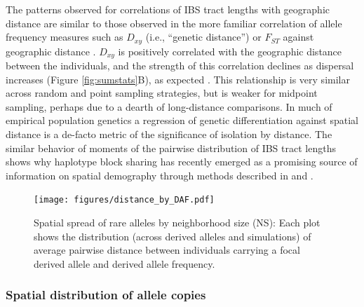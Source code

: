 \documentclass[10pt,twoside,lineno,hidelinks]{preprint}
\begin{document}

The patterns observed for correlations of IBS tract lengths with geographic distance are similar to those observed in the more familiar correlation of allele frequency measures such as $D_{xy}$ (i.e., ``genetic distance'') or $F_{ST}$ against geographic distance \citep{Rousset1997}. $D_{xy}$ is positively correlated with the geographic distance between the individuals, and the strength of this correlation declines as dispersal increases (Figure \ref{fig:sumstats}B), as expected \citep{Wright1943,Rousset1997}. This relationship is very similar across random and point sampling strategies, but is weaker for midpoint sampling, perhaps due to a dearth of long-distance comparisons. In much of empirical population genetics a regression of genetic differentiation against spatial distance is a de-facto metric of the significance of isolation by distance. The similar behavior of moments of the pairwise distribution of IBS tract lengths shows why haplotype block sharing has recently emerged as a promising source of information on spatial demography through methods described in \citet{Ringbauer2017} and \citet{Baharian2016}. 

\begin{figure}[p]
\centering
\texttt{[image: figures/distance\_by\_DAF.pdf]}
\caption{
    Spatial spread of rare alleles by neighborhood size (NS):
    Each plot shows the distribution (across derived alleles and simulations)
    of average pairwise distance between individuals carrying a focal derived allele
    and derived allele frequency.
}
\label{fig:dafdists}
\end{figure}

\subsubsection{Spatial distribution of allele copies}
\end{document}
